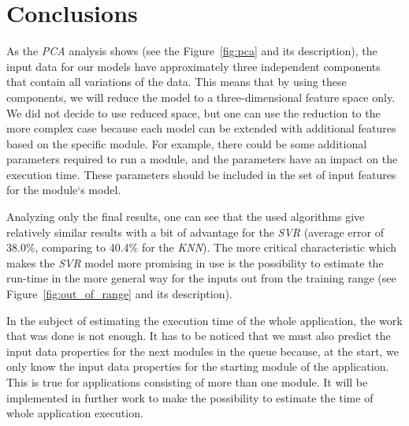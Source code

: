 \section{Conclusions}

As the \textit{PCA} analysis shows (see the Figure~\ref{fig:pca} and its description), the input data for our models have approximately three independent components that contain all variations of the data. This means that by using these components, we will reduce the model to a three-dimensional feature space only. We did not decide to use reduced space, but one can use the reduction to the more complex case because each model can be extended with additional features based on the specific module. For example, there could be some additional parameters required to run a module, and the parameters have an impact on the execution time. These parameters should be included in the set of input features for the module`s model.

Analyzing only the final results, one can see that the used algorithms give relatively similar results with a bit of advantage for the \textit{SVR} (average error of 38.0\%, comparing to 40.4\% for the \textit{KNN}). The more critical characteristic which makes the \textit{SVR} model more promising in use is the possibility to estimate the run-time in the more general way for the inputs out from the training range (see Figure~\ref{fig:out_of_range} and its description). 

In the subject of estimating the execution time of the whole application, the work that was done is not enough. It has to be noticed that we must also predict the input data properties for the next modules in the queue because, at the start, we only know the input data properties for the starting module of the application. This is true for applications consisting of more than one module. It will be implemented in further work to make the possibility to estimate the time of whole application execution.
